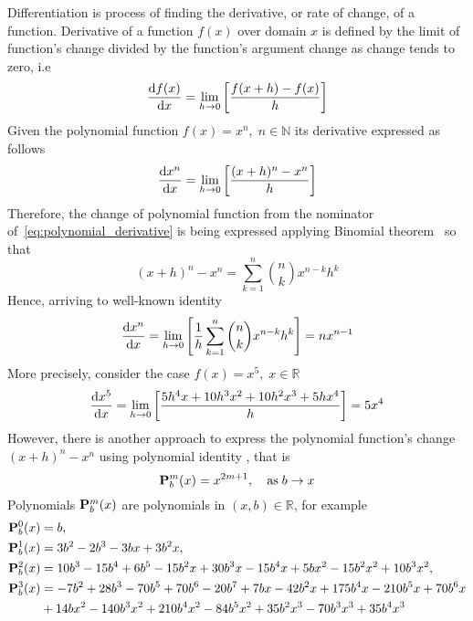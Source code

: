 Differentiation is process of finding the derivative, or rate of change, of a function.
Derivative of a function $f(x)$ over domain $x$ is defined by the limit of function's change divided
by the function's argument change as change tends to zero, i.e
\begin{equation*}
    \odv{f(x)}{x} = \lim_{h \to 0} \left[ \frac{f(x+h) - f(x)}{h} \right]
\end{equation*}
Given the polynomial function $f(x)=x^n, \; n \in \mathbb{N}$ its derivative expressed as follows
\begin{equation}
    \odv{x^n}{x} = \lim_{h \to 0} \left[ \frac{(x+h)^n - x^n}{h} \right] \label{eq:polynomial_derivative}
\end{equation}
Therefore, the change of polynomial function from the nominator of~\eqref{eq:polynomial_derivative}
is being expressed applying Binomial theorem~\cite{abramowitz1972handbook} so that
\begin{equation*}
(x+h)
    ^n - x^n = \sum_{k=1}^{n} \binom{n}{k} x^{n-k} h^k
\end{equation*}
Hence, arriving to well-known identity
\begin{equation*}
    \odv{x^n}{x} = \lim_{h \to 0} \left[ \frac{1}{h} \sum_{k=1}^{n} \binom{n}{k} x^{n-k} h^k \right] = n x^{n-1}
\end{equation*}
More precisely, consider the case $f(x) = x^5, \; x\in\mathbb{R}$
\begin{equation*}
    \odv{x^5}{x} = \lim_{h \to 0} \left[ \frac{5 h^4 x + 10 h^3 x^2 + 10 h^2 x^3 + 5 h x^4}{h} \right] = 5x^4
\end{equation*}
However, there is another approach to express the polynomial function's change $(x+h)^n - x^n$ using polynomial identity
\cite{kolosov2016link}, that is
\begin{equation*}
    {\mathbf{P}}\sp{m} \sb{b}(x) = x^{2m+1}, \quad \mathrm{as} \; b \to x
\end{equation*}
Polynomials ${\mathbf{P}}\sp{m} \sb{b}(x)$ are polynomials in $(x,b) \in \mathbb{R}$, for example
\begin{equation*}
    \begin{split}
        {\mathbf{P}}\sp{0} \sb{b}(x)
        &=b, \\
        {\mathbf{P}}\sp{1} \sb{b}(x)
        &=3 b^2 - 2 b^3 - 3 b x + 3 b^2 x, \\
        {\mathbf{P}}\sp{2} \sb{b}(x)
        &=10 b^3 - 15 b^4 + 6 b^5 - 15 b^2 x + 30 b^3 x - 15 b^4 x + 5 b x^2 - 15 b^2 x^2 + 10 b^3 x^2, \\
        {\mathbf{P}}\sp{3} \sb{b}(x)
        &=-7 b^2 + 28 b^3 - 70 b^5 + 70 b^6 - 20 b^7 + 7 b x - 42 b^2 x + 175 b^4 x - 210 b^5 x + 70 b^6 x \\
        &+ 14 b x^2 - 140 b^3 x^2 + 210 b^4 x^2 - 84 b^5 x^2 + 35 b^2 x^3 - 70 b^3 x^3 + 35 b^4 x^3
    \end{split}
\end{equation*}
